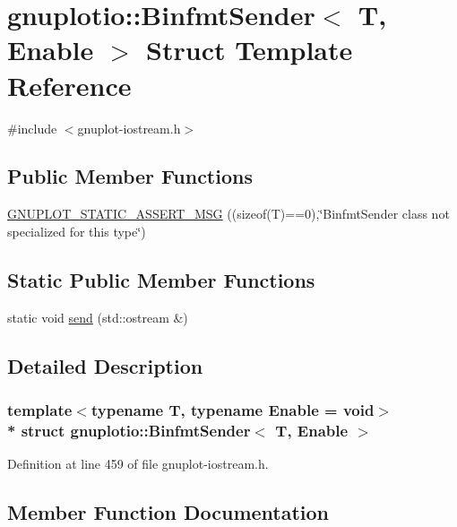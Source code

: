 \hypertarget{structgnuplotio_1_1_binfmt_sender}{}\section{gnuplotio\+:\+:Binfmt\+Sender$<$ T, Enable $>$ Struct Template Reference}
\label{structgnuplotio_1_1_binfmt_sender}


{\ttfamily \#include $<$gnuplot-\/iostream.\+h$>$}

\subsection*{Public Member Functions}
\begin{DoxyCompactItemize}
\item 
\hyperlink{structgnuplotio_1_1_binfmt_sender_ab0b554a2e81309917b2fa6f480e2a8e2}{G\+N\+U\+P\+L\+O\+T\+\_\+\+S\+T\+A\+T\+I\+C\+\_\+\+A\+S\+S\+E\+R\+T\+\_\+\+M\+SG} ((sizeof(T)==0),\char`\"{}Binfmt\+Sender class not specialized for this type\char`\"{})
\end{DoxyCompactItemize}
\subsection*{Static Public Member Functions}
\begin{DoxyCompactItemize}
\item 
static void \hyperlink{structgnuplotio_1_1_binfmt_sender_a762010e3172c02e981252f93185b29c8}{send} (std\+::ostream \&)
\end{DoxyCompactItemize}


\subsection{Detailed Description}
\subsubsection*{template$<$typename T, typename Enable = void$>$\\*
struct gnuplotio\+::\+Binfmt\+Sender$<$ T, Enable $>$}



Definition at line 459 of file gnuplot-\/iostream.\+h.



\subsection{Member Function Documentation}
